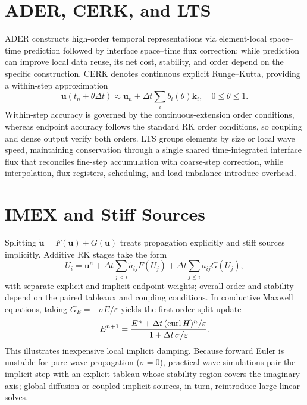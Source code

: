 \section{ADER, CERK, and LTS}
ADER constructs high-order temporal representations via element-local space--time prediction followed by interface space--time flux correction; while prediction can improve local data reuse, its net cost, stability, and order depend on the specific construction.
CERK denotes continuous explicit Runge--Kutta, providing a within-step approximation
\[
 \bm u(t_n+\theta\Delta t)
 \approx\bm u_n+\Delta t\sum_i b_i(\theta)\bm k_i,\quad0\le\theta\le1.
\]
Within-step accuracy is governed by the continuous-extension order conditions, whereas endpoint accuracy follows the standard RK order conditions, so coupling and dense output verify both orders.
LTS groups elements by size or local wave speed, maintaining conservation through a single shared time-integrated interface flux that reconciles fine-step accumulation with coarse-step correction, while interpolation, flux registers, scheduling, and load imbalance introduce overhead.
\section{IMEX and Stiff Sources}
Splitting $\dot{\bm u}=F(\bm u)+G(\bm u)$ treats propagation explicitly and stiff sources implicitly. Additive RK stages take the form
\[
 U_i=\bm u^n+\Delta t\sum_{j<i}\widetilde a_{ij}F(U_j)
                  +\Delta t\sum_{j\le i}a_{ij}G(U_j),
\]
with separate explicit and implicit endpoint weights; overall order and stability depend on the paired tableaux and coupling conditions.
In conductive Maxwell equations, taking $G_E=-\sigma E/\varepsilon$ yields the first-order split update
\[
 E^{n+1}=\frac{E^n+\Delta t\,(\operatorname{curl} H)^n/\varepsilon}
 {1+\Delta t\,\sigma/\varepsilon}.
\]
This illustrates inexpensive local implicit damping. Because forward Euler is unstable for pure wave propagation ($\sigma=0$), practical wave simulations pair the implicit step with an explicit tableau whose stability region covers the imaginary axis; global diffusion or coupled implicit sources, in turn, reintroduce large linear solves.
